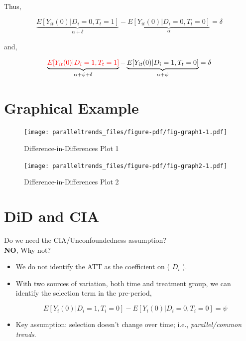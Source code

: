 \documentclass[
  letterpaper,
  DIV=11,
  numbers=noendperiod]{scrreprt}
\theoremstyle{definition}
\theoremstyle{remark}
\begin{document}
Thus,

\[
\underbrace{E[Y_{it}(0)|D_i=0,T_t=1]}_{\alpha + \delta} - \underbrace{E[Y_{it}(0)|D_i=0,T_t=0]}_{\alpha} = \delta
\]

and,

\[
\underbrace{\textcolor{red}{E[Y_{it}(0)|D_i=1,T_t=1]}}_{\alpha + \psi + \delta} - \underbrace{E[Y_{it}(0)|D_i=1,T_t=0]}_{\alpha + \psi} = \delta
\]

\hypertarget{graphical-example}{%
\section{Graphical Example}\label{graphical-example}}

\begin{figure}

{\centering \texttt{[image: paralleltrends\_files/figure-pdf/fig-graph1-1.pdf]}

}

\caption{\label{fig-graph1}Difference-in-Differences Plot 1}

\end{figure}

\begin{figure}

{\centering \texttt{[image: paralleltrends\_files/figure-pdf/fig-graph2-1.pdf]}

}

\caption{\label{fig-graph2}Difference-in-Differences Plot 2}

\end{figure}

\hypertarget{did-and-cia}{%
\section{DiD and CIA}\label{did-and-cia}}

Do we need the CIA/Unconfoundedness assumption?\\
\textbf{NO}, Why not?

\begin{itemize}
\item
  We do not identify the ATT as the coefficient on ( \(D_i\) ).
\item
  With two sources of variation, both time and treatment group, we can
  identify the selection term in the pre-period,

  \[
  E[Y_i(0)|D_i=1,T_i=0] - E[Y_i(0)|D_i=0,T_i=0] = \psi
  \]
\item
  Key assumption: selection doesn't change over time; i.e.,
  \emph{parallel/common trends}.
\end{itemize}
\end{document}
